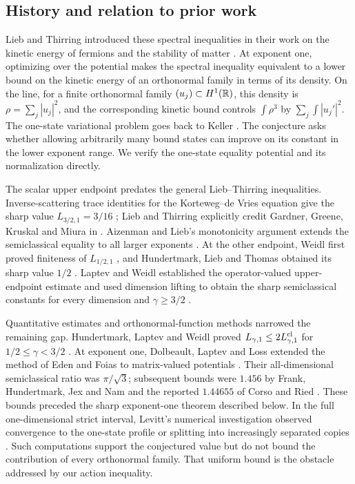 \subsection{History and relation to prior work}

Lieb and Thirring introduced these spectral inequalities in their work on
the kinetic energy of fermions and the stability of matter
\cite{LiebThirring1975,LiebThirring1976}. At exponent one, optimizing over
the potential makes the spectral inequality equivalent to a lower bound
on the kinetic energy of an orthonormal family in terms of its density.
On the line, for a finite orthonormal family $(u_j)\subset H^1(\mathbb R)$, this
density is $\rho=\sum_j|u_j|^2$, and the corresponding kinetic bound
controls $\int\rho^3$ by $\sum_j\int|u_j'|^2$.
The one-state variational problem goes back to Keller \cite{Keller1961}.
The conjecture asks whether allowing arbitrarily many bound states can
improve on its constant in the lower exponent range. We verify the
one-state equality potential and its normalization directly.

The scalar upper endpoint predates the general Lieb--Thirring inequalities.
Inverse-scattering trace identities for the Korteweg--de Vries equation
give the sharp value $L_{3/2,1}=3/16$
\cite{ZakharovFaddeev1971,GardnerGreeneKruskalMiura1974};
Lieb and Thirring explicitly credit Gardner, Greene, Kruskal and Miura
in \cite[Section~4(B)]{LiebThirring1976}.
Aizenman and Lieb's monotonicity argument extends the semiclassical
equality to all larger exponents \cite{AizenmanLieb1978}.
At the other endpoint, Weidl first proved finiteness of $L_{1/2,1}$
\cite{Weidl1996}, and Hundertmark, Lieb and Thomas obtained its sharp
value $1/2$ \cite[Theorem~1]{HundertmarkLiebThomas1998}.
Laptev and Weidl established the operator-valued upper-endpoint estimate
and used dimension lifting to obtain the sharp semiclassical constants
for every dimension and $\gamma\ge3/2$
\cite[Theorems~2.1, 2.2 and~3.1]{LaptevWeidl2000}.

Quantitative estimates and orthonormal-function methods narrowed the
remaining gap. Hundertmark, Laptev and Weidl proved
$L_{\gamma,1}\le2L_{\gamma,1}^{\mathrm{cl}}$ for $1/2\le\gamma<3/2$
\cite[Theorem~4.1]{HLW2000}.
At exponent one, Dolbeault, Laptev and Loss extended the method of
Eden and Foias to matrix-valued potentials
\cite{EdenFoias1991,DLL2008}. Their all-dimensional semiclassical ratio
was $\pi/\sqrt3$; subsequent bounds were $1.456$ by Frank, Hundertmark,
Jex and Nam \cite[Theorem~1]{FHJN2021} and the reported $1.44655$
of Corso and Ried \cite[Corollary~1.7]{CorsoRied2025}.
These bounds preceded the sharp exponent-one theorem described below.
In the full one-dimensional strict interval, Levitt's numerical
investigation observed convergence to the one-state profile or splitting
into increasingly separated copies \cite[Section~4.1]{Levitt2014}.
Such computations support the conjectured value but do not bound the
contribution of every orthonormal family. That uniform bound is the
obstacle addressed by our action inequality.

